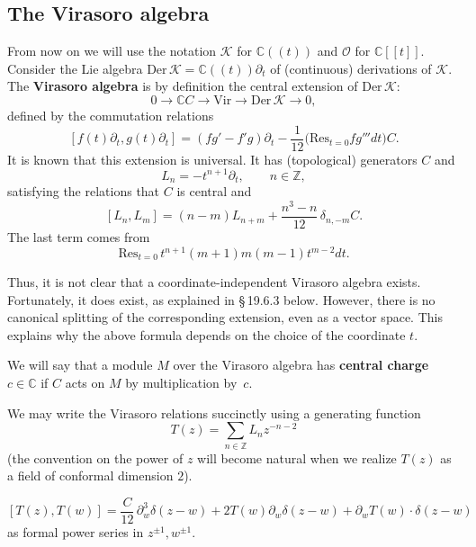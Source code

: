 \documentclass[12pt]{article}
\begin{document}
\subsection{The Virasoro algebra}
From now on we will use the notation $\mathcal{K}$ for $\mathbb{C}((t))$ and
$\mathcal{O}$ for $\mathbb{C}[[t]]$.
Consider the Lie algebra $\mathrm{Der}\,\mathcal{K} = \mathbb{C}((t))\partial_t$
of (continuous) derivations of $\mathcal{K}$.
The \textbf{Virasoro algebra} is by definition the central extension of
$\mathrm{Der}\,\mathcal{K}$:
\[
    0 \to \mathbb{C}C \to \mathrm{Vir} \to \mathrm{Der}\,\mathcal{K} \to 0,
\]
defined by the commutation relations
\begin{equation}\label{2.5.1}
    [f(t)\partial_t, g(t)\partial_t]
    = (fg' - f'g)\partial_t - \frac{1}{12}\big(\mathrm{Res}_{t=0}f g'''dt\big)C.
\end{equation}
It is known that this extension is universal. It has (topological) generators
$C$ and
\[
    L_n = -t^{n+1}\partial_t, \qquad n\in\mathbb{Z},
\]
satisfying the relations that $C$ is central and
\begin{equation}\label{2.5.2}
    [L_n,L_m] = (n-m)L_{n+m} + \frac{n^3 - n}{12}\,\delta_{n,-m}C.
\end{equation}
The last term comes from
\[
    \mathrm{Res}_{t=0}\, t^{n+1}(m+1)m(m-1)t^{m-2}dt.
\]

 Thus, it is not clear
that a coordinate-independent Virasoro algebra exists. Fortunately, it does
exist, as explained in \S\,19.6.3 below. However, there is no canonical splitting of the corresponding extension, even as a vector space. This explains why the above formula depends on the choice of the coordinate $t$.

We will say that a module $M$ over the Virasoro algebra has
\textbf{central charge} $c\in\mathbb{C}$ if $C$ acts on $M$
by multiplication by~$c$.

We may write the Virasoro relations succinctly using a generating function
\[
    T(z) = \sum_{n\in\mathbb{Z}} L_n z^{-n-2}
\]
(the convention on the power of $z$ will become natural when we realize
$T(z)$ as a field of conformal dimension $2$).

\begin{lemma}[2.5.4]
    \[
        [T(z),T(w)]
        = \frac{C}{12}\,\partial_w^3\delta(z-w)
        + 2T(w)\partial_w\delta(z-w)
        + \partial_w T(w)\cdot\delta(z-w)
    \]
    as formal power series in $z^{\pm1},w^{\pm1}$.
\end{lemma}
\end{document}
